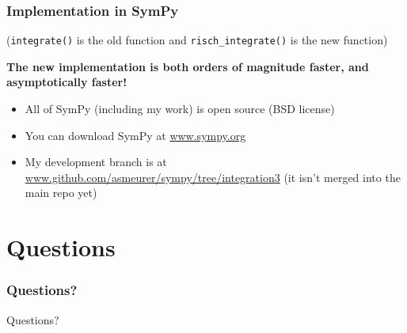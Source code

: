 \documentclass{beamer}
\numberwithin{equation}{section} %
\newcommand{\rischintegrate}{\texttt{risch\_integrate()}}
\begin{document}
\begin{frame}
    \frametitle{Implementation in SymPy}
    (\texttt{integrate()} is the old function and \rischintegrate{} is
    the new function)
    \begin{figure}
    \begin{flushleft}
    \end{flushleft}
    \end{figure}
    \pause
    {\bf The new implementation is both orders of magnitude faster, and
    asymptotically faster!}
\end{frame}

\begin{frame}
    \begin{itemize}
        \item All of SymPy (including my work) is open source (BSD license)
        \item You can download SymPy at \url{www.sympy.org}
        \item My development branch is at
        \url{www.github.com/asmeurer/sympy/tree/integration3} (it
        isn't merged into the main repo yet)
    \end{itemize}
\end{frame}

\section{Questions}

\begin{frame}
    \frametitle{Questions?}
    \huge{Questions?}
\end{frame}
\end{document}
